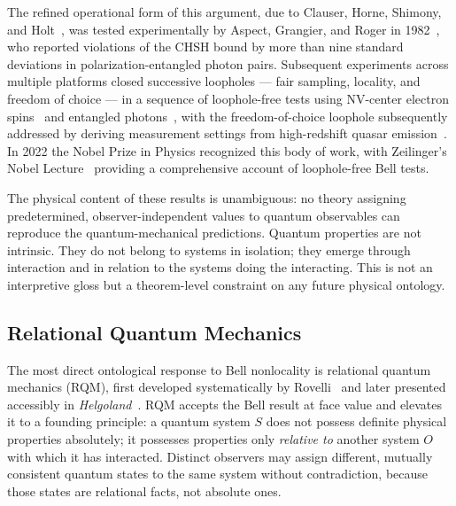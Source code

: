 The refined operational form of this argument, due to Clauser, Horne,
Shimony, and Holt~\cite{CHSH1969}, was tested experimentally by
Aspect, Grangier, and Roger in 1982~\cite{Aspect1982}, who reported
violations of the CHSH bound by more than nine standard deviations in
polarization-entangled photon pairs.
Subsequent experiments across multiple platforms closed successive
loopholes --- fair sampling, locality, and freedom of choice --- in a
sequence of loophole-free tests using NV-center electron
spins~\cite{Hensen2015} and entangled
photons~\cite{Giustina2015,Shalm2015}, with the freedom-of-choice
loophole subsequently addressed by deriving measurement settings from
high-redshift quasar emission~\cite{Rauch2018}.
In 2022 the Nobel Prize in Physics recognized this body of work, with
Zeilinger's Nobel Lecture~\cite{Zeilinger2022Nobel} providing a
comprehensive account of loophole-free Bell tests.

The physical content of these results is unambiguous: no theory
assigning predetermined, observer-independent values to quantum
observables can reproduce the quantum-mechanical predictions.
Quantum properties are not intrinsic.
They do not belong to systems in isolation; they emerge through
interaction and in relation to the systems doing the interacting.
This is not an interpretive gloss but a theorem-level constraint on
any future physical ontology.


\subsection{\label{sec:rqm}Relational Quantum Mechanics}

The most direct ontological response to Bell nonlocality is relational
quantum mechanics (RQM), first developed systematically by
Rovelli~\cite{Rovelli1996} and later presented accessibly in
\textit{Helgoland}~\cite{Rovelli2021}.
RQM accepts the Bell result at face value and elevates it to a founding
principle: a quantum system $S$ does not possess definite physical
properties absolutely; it possesses properties only \emph{relative to}
another system $O$ with which it has interacted.
Distinct observers may assign different, mutually consistent quantum
states to the same system without contradiction, because those states are
relational facts, not absolute ones.

